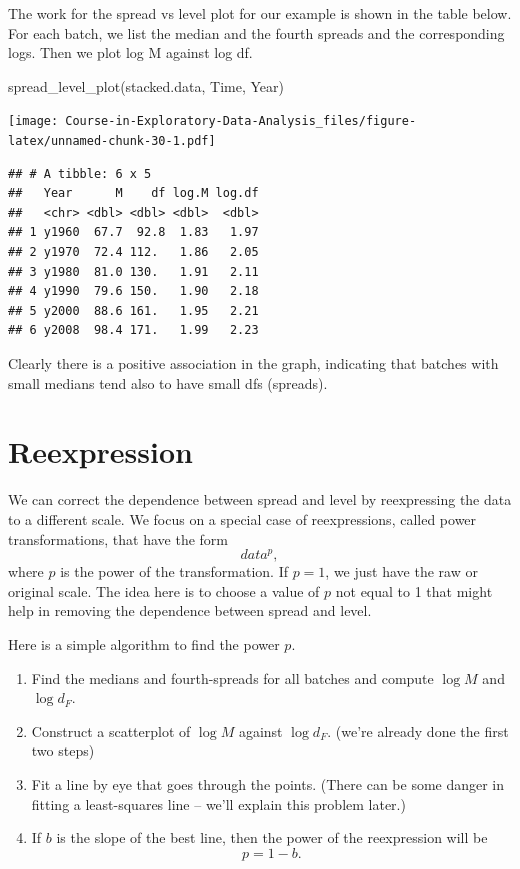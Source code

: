 \documentclass[
]{book}
\newenvironment{Shaded}{\begin{snugshade}}{\end{snugshade}}
\newcommand{\FunctionTok}[1]{\textcolor[rgb]{0.00,0.00,0.00}{#1}}
\newcommand{\NormalTok}[1]{#1}
\providecommand{\tightlist}{%
  \setlength{\itemsep}{0pt}\setlength{\parskip}{0pt}}
\begin{document}
The work for the spread vs level plot for our example is shown in the table below. For each batch, we list the median and the fourth spreads and the corresponding logs. Then we plot log M against log df.

\begin{Shaded}
\begin{Highlighting}[]
\FunctionTok{spread\_level\_plot}\NormalTok{(stacked.data, Time, Year)}
\end{Highlighting}
\end{Shaded}

\texttt{[image: Course-in-Exploratory-Data-Analysis\_files/figure-latex/unnamed-chunk-30-1.pdf]}

\begin{verbatim}
## # A tibble: 6 x 5
##   Year      M    df log.M log.df
##   <chr> <dbl> <dbl> <dbl>  <dbl>
## 1 y1960  67.7  92.8  1.83   1.97
## 2 y1970  72.4 112.   1.86   2.05
## 3 y1980  81.0 130.   1.91   2.11
## 4 y1990  79.6 150.   1.90   2.18
## 5 y2000  88.6 161.   1.95   2.21
## 6 y2008  98.4 171.   1.99   2.23
\end{verbatim}

Clearly there is a positive association in the graph, indicating that batches with small medians tend also to have small dfs (spreads).

\hypertarget{reexpression}{%
\section{Reexpression}\label{reexpression}}

We can correct the dependence between spread and level by reexpressing the data to a different scale. We focus on a special case of reexpressions, called power transformations, that have the form
\[
 data^p,
 \]
where \(p\) is the power of the transformation. If \(p = 1\), we just have the raw or original scale. The idea here is to choose a value of \(p\) not equal to 1 that might help in removing the dependence between spread and level.

Here is a simple algorithm to find the power \(p\).

\begin{enumerate}
\def\labelenumi{\arabic{enumi}.}
\tightlist
\item
  Find the medians and fourth-spreads for all batches and compute
  \(\log M\) and \(\log d_F\).
\item
  Construct a scatterplot of \(\log M\) against \(\log d_F\).
  (we're already done the first two steps)
\item
  Fit a line by eye that goes through the points. (There can be some danger in fitting a least-squares line -- we'll explain this problem later.)
\item
  If \(b\) is the slope of the best line, then the power of the reexpression will be
  \[
  p = 1 - b.
  \]
\end{enumerate}
\end{document}

